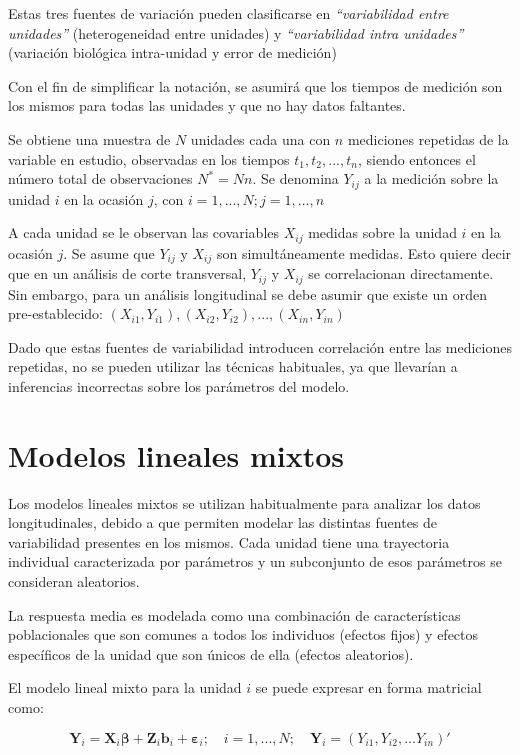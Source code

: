 \documentclass[spanish]{article}
\numberwithin{figure}{subsection}
\numberwithin{equation}{subsection}
\numberwithin{table}{subsection}
\begin{document}
Estas tres fuentes de variación pueden clasificarse en \textit{``variabilidad
entre unidades''} (heterogeneidad entre unidades) y \textit{``variabilidad
intra unidades''} (variación biológica intra-unidad y error de medición)

Con el fin de simplificar la notación, se asumirá que los tiempos de medición
son los mismos para todas las unidades y que no hay datos faltantes.

Se obtiene una muestra de $N$ unidades cada una con $n$ mediciones repetidas de
la variable en estudio, observadas en los tiempos $t_1, t_2, ..., t_n$, siendo
entonces el número total de observaciones $N^*=Nn$. Se denomina $Y_{ij}$ a la
medición sobre la unidad $i$ en la ocasión $j$, con $i=1, ..., N; j=1, ..., n$

A cada unidad se le observan las covariables $X_{ij}$ medidas sobre la unidad $i$
en la ocasión $j$. Se asume que $Y_{ij}$ y $X_{ij}$ son simultáneamente medidas.
Esto quiere decir que en un análisis de corte transversal, $Y_{ij}$ y $X_{ij}$
se correlacionan directamente. Sin embargo, para un análisis longitudinal se
debe asumir que existe un orden pre-establecido: $(X_{i1}, Y_{i1}), (X_{i2},
Y_{i2}), ..., (X_{in}, Y_{in})$

Dado que estas fuentes de variabilidad introducen correlación entre las
mediciones repetidas, no se pueden utilizar las técnicas habituales, ya que
llevarían a inferencias incorrectas sobre los parámetros del modelo.

\section{Modelos lineales mixtos}

Los modelos lineales mixtos se utilizan habitualmente para analizar los datos
longitudinales, debido a que permiten modelar las distintas fuentes de
variabilidad presentes en los mismos. Cada unidad tiene una trayectoria
individual caracterizada por parámetros y un subconjunto de esos parámetros se
consideran aleatorios.

La respuesta media es modelada como una combinación de características
poblacionales que son comunes a todos los individuos (efectos fijos) y efectos
específicos de la unidad que son únicos de ella (efectos aleatorios).

El modelo lineal mixto para la unidad $i$ se puede expresar en forma matricial
como:

\[
	\bm{Y}_i = \bm{X}_i\bm{\beta} + \bm{Z}_i\bm{b}_i + \bm{\varepsilon}_i;
	\quad i = 1, ..., N;
	\quad \bm{Y}_i = (Y_{i1}, Y_{i2}, ... Y_{in})'
\]
\end{document}

